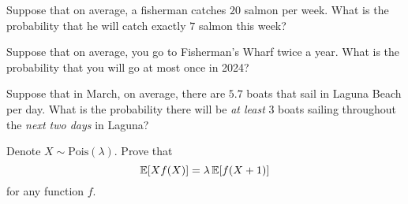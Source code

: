 \documentclass[11pt]{article}
\begin{document}
\begin{Parts}

\Part Suppose that on average, a fisherman catches $20$ salmon per week. What 
is the probability that he will catch exactly $7$ salmon this week?

\Part Suppose that on average, you go to Fisherman's Wharf twice a year. What 
is the probability that you will go at most once in 2024?

\Part Suppose that in March, on average, there are $5.7$ boats that sail in 
Laguna Beach per day. What is the probability there will be \textit{at least} 
$3$ boats sailing throughout the \textit{next two days} in Laguna?

\Part Denote $X \sim \text{Pois}(\lambda)$. Prove that \[ \operatorname{\mathbb{E}}[Xf(X)] = \lambda 
\operatorname{\mathbb{E}}[f(X+1)] \] for any function $f$. 

\end{Parts}
\end{document}
